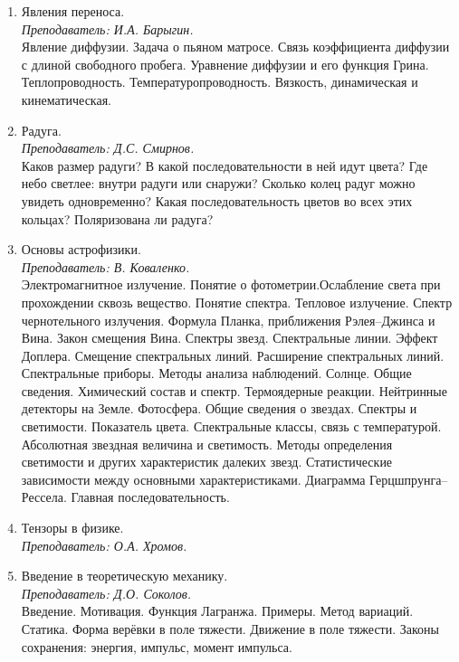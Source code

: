 \documentclass[11pt]{article}
\newlength{\h}
\newlength{\x}
\begin{document}
\begin{enumerate}
\item Явления переноса. \\[0.2cm]
  \textit{Преподаватель: И.А. Барыгин. }\\[0.2cm]
  Явление диффузии. Задача о пьяном матросе. Связь коэффициента
  диффузии с длиной свободного пробега. Уравнение диффузии и его
  функция Грина. Теплопроводность. Температуропроводность. Вязкость,
  динамическая и кинематическая.
\item Радуга. \\[0.2cm]
  \textit{Преподаватель: Д.С. Смирнов.}\\[0.2cm]
  Каков размер радуги? В какой последовательности в ней идут цвета?
  Где небо светлее: внутри радуги или снаружи? Сколько колец радуг
  можно увидеть одновременно? Какая последовательность цветов во всех
  этих кольцах? Поляризована ли радуга?
\item Основы астрофизики. \\[0.2cm]
  \textit{Преподаватель: В. Коваленко.}\\[0.2cm]
  Электромагнитное излучение. Понятие о фотометрии.Ослабление света
  при прохождении сквозь вещество. Понятие спектра. Тепловое
  излучение. Спектр чернотельного излучения. Формула Планка,
  приближения Рэлея--Джинса и Вина. Закон смещения Вина. Спектры
  звезд. Спектральные линии. Эффект Доплера. Смещение спектральных
  линий. Расширение спектральных линий. Спектральные приборы. Методы
  анализа наблюдений. Солнце. Общие сведения. Химический состав и
  спектр. Термоядерные реакции. Нейтринные детекторы на
  Земле. Фотосфера. Общие сведения о звездах. Спектры и
  светимости. Показатель цвета.  Спектральные классы, связь с
  температурой. Абсолютная звездная величина и светимость. Методы
  определения светимости и других характеристик далеких
  звезд. Статистические зависимости между основными
  характеристиками. Диаграмма Герцшпрунга--Рессела. Главная
  последовательность.
\item Тензоры в физике. \\
  \textit{Преподаватель: О.А. Хромов.}
\item Введение в теоретическую механику. \\[0.2cm]
  \textit{Преподаватель: Д.О. Соколов.}\\[0.2cm]
  Введение. Мотивация. Функция Лагранжа. Примеры. Метод
  вариаций. Статика. Форма верёвки в поле тяжести. Движение в поле
  тяжести. Законы сохранения: энергия, импульс, момент импульса.
\end{enumerate}
\end{document}
